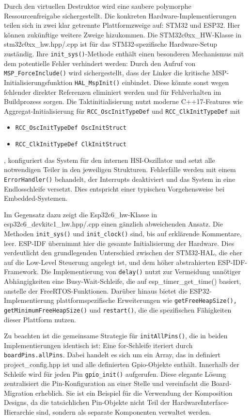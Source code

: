 Durch den virtuellen Destruktor wird eine saubere polymorphe Ressourcenfreigabe sichergestellt.
Die konkreten Hardware-Implementierungen teilen sich in zwei klar getrennte Plattformzweige auf: STM32 und ESP32. 
Hier können zukünftige weitere Zweige hizukommen.
Die STM32c0xx\_HW-Klasse in stm32c0xx\_hw.hpp/.cpp ist für das STM32-spezifische Hardware-Setup zuständig.
Ihre \texttt{init\_sys()}-Methode enthält einen besonderen Mechanismus mit dem potentielle Fehler verhindert werden:
Durch den Aufruf von \texttt{MSP\_ForceInclude()} wird sichergestellt, dass der Linker die kritische MSP-Initialisierungsfunktion \texttt{HAL\_MspInit()} einbindet. 
Diese könnte sonst wegen fehlender direkter Referenzen eliminiert werden und für Fehlverhalten im Buildprozess sorgen.
Die Taktinitialisierung nutzt moderne C++17-Features wie Aggregat-Initialisierung für \texttt{RCC\_OscInitTypeDef} und \texttt{RCC\_ClkInitTypeDef} mit 

\begin{itemize}
	\item \texttt{RCC\_OscInitTypeDef OscInitStruct{}}
	\item \texttt{RCC\_ClkInitTypeDef ClkInitStruct{}}
\end{itemize}

, konfiguriert das System für den internen HSI-Oszillator und setzt alle notwendigen Teiler in den jeweiligen Strukturen.
Fehlerfälle werden mit einem \texttt{ErrorHandler()} behandelt, der Interrupts deaktiviert und das System in eine Endlosschleife versetzt.
Dies entspricht einer typischen Vorgehensweise bei Embedded-Systemen.

Im Gegensatz dazu zeigt die Esp32c6\_hw-Klasse in esp32c6\_devkitc1\_hw.hpp/.cpp einen gänzlich abweichenden Ansatz.
Die Methoden \texttt{init\_sys()} und \texttt{init\_clock()} sind, bis auf erklärende Kommentare, leer.
ESP-IDF übernimmt hier die gesamte Initialisierung der Hardware.
Dies verdeutlicht den grundlegenden Unterschied zwischen der STM32-HAL, die eher auf die Low-Level Steuerung angelegt ist, und dem höher abstrahierten ESP-IDF-Framework.
Die Implementierung von \texttt{delay()} nutzt zur Vermeidung unnötiger Abhängigkeiten eine Busy-Wait-Schleife, die auf esp\_timer\_get\_time() basiert, anstelle der FreeRTOS-Funktionen.
Darüber hinaus bietet die ESP32-Implementierung plattformspezifische Erweiterungen wie \texttt{getFreeHeapSize(), getMinimumFreeHeapSize()} und \texttt{restart()}, die die spezifischen Fähigkeiten dieser Plattform nutzen.

Zu beachten ist die gemeinsame Strategie für \texttt{initAllPins()}, die in beiden Implementierungen identisch ist: 
Eine for-Schleife iteriert durch \texttt{boardPins.allPins}.
Dabei handelt es sich um ein Array, das in definiert project\_config.hpp ist und alle definierten Gpio-Objekte enthält.
Innerhalb der Schleife wird für jeden Pin \texttt{gpio\_init()} aufgerufen.
Diese elegante Lösung zentralisiert die Pin-Konfiguration an einer Stelle und vereinfacht die Board-Migration erheblich. 
Sie ist ein Beispiel für die Verwendung der Komposition Designs, da die tatsächlichen Pin-Objekte nicht Teil der HardwareInterface-Hierarchie sind, sondern als separate Komponenten verwaltet werden.

